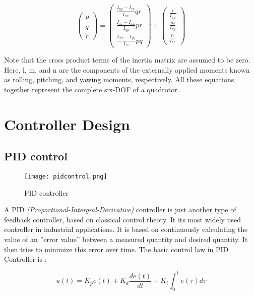 	\begin{equation}
	\begin{pmatrix}
	\dot{p} \\ \dot{q} \\ \dot{r}
	\end{pmatrix}
	= \begin{pmatrix}
	\frac{I_{yy} - I_{zz}}{I_{xx}} qr \\ \frac{I_{zz} - I_{xx}}{I_{yy}} pr \\ \frac{I_{xx} - I_{yy}}{I_{zz}} pq
	\end{pmatrix}
	+ \begin{pmatrix}
	\frac{l}{I_{xx}} \\ \frac{m}{I_{yy}} \\ \frac{n}{I_{zz}}
	\end{pmatrix}
	\end{equation}
	
	Note that the cross product terms of the inertia matrix are assumed to be
	zero. Here, l, m, and n are the components of the externally applied moments
	known as rolling, pitching, and yawing moments, respectively. All these
	equations together represent the complete six-DOF of a quadrotor.
	
	
	\section{Controller Design}
	\label{sec:Controller Design}
	
	\subsection{PID control}
	\label{sec:PID control}
	
	\makeatletter
	\setlength{\@fptop}{0pt}
	\makeatother
	\begin{figure}[htb]
		\centering
		\texttt{[image: pidcontrol.png]}
		\caption{PID controller\label{ROS working}}
	\end{figure}
	
	A PID \emph{(Proportional-Intergral-Derivative)} controller is just another type of feedback controller, based on classical control theory. It its most widely used
	controller in industrial applications. It is based on continuously calculating
	the value of an ”error value” between a measured quantity and desired quantity. It then tries to minimize this error over time.
	The basic control law in PID Controller is :
	
	\begin{equation}
	u(t) = K_{p}e(t) + K_{d}\frac{de(t)}{dt} + K_{i}\int_{0}^{t} e(\tau) d\tau
	\end{equation}
	
